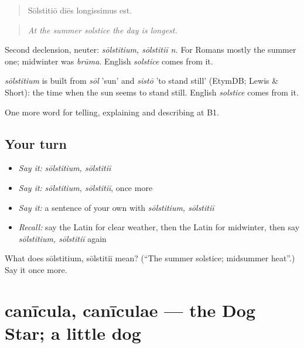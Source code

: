 \begin{quote}
Sōlstitiō diēs longissimus est.
\end{quote}

\begin{quote}
\emph{At the summer solstice the day is longest.}
\end{quote}

Second declension, neuter: \emph{sōlstitium, sōlstitiī n.} For Romans mostly the summer one; midwinter was \emph{brūma}. English \emph{solstice} comes from it.

\begin{cousinweb}
\emph{sōlstitium} is built from \emph{sōl} 'sun' and \emph{sistō} 'to stand still' (EtymDB; Lewis \& Short): the time when the sun seems to stand still. English \emph{solstice} comes from it.
\end{cousinweb}

\begin{grammarlens}[title={What you've built}]
One more word for telling, explaining and describing at B1.
\end{grammarlens}

\subsection*{Your turn}
\begin{itemize}
\raggedright
  \item \emph{Say it:} \emph{sōlstitium, sōlstitiī}
  \item \emph{Say it:} \emph{sōlstitium, sōlstitiī}, once more
  \item \emph{Say it:} a sentence of your own with \emph{sōlstitium, sōlstitiī}
  \item \emph{Recall:} say the Latin for clear weather, then the Latin for midwinter, then say \emph{sōlstitium, sōlstitiī} again
\end{itemize}

\begin{tcolorbox}[breakable,colback=teal!4,colframe=teal!35!black,title={Before you move on}]
What does sōlstitium, sōlstitiī mean? (\textquotedblleft{}The summer solstice; midsummer heat\textquotedblright{}.) Say it once more.
\end{tcolorbox}
\section[canīcula, canīculae]{canīcula, canīculae — the Dog Star; a little dog}


